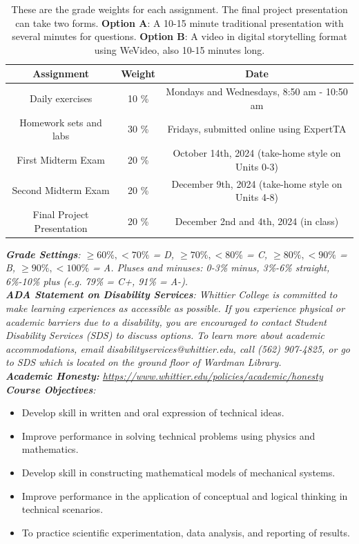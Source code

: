 \documentclass[10pt]{article}
\begin{document}
\begin{table}
\centering
\begin{tabular}{| c | c | c |}
\hline
\textbf{Assignment} & \textbf{Weight} & \textbf{Date} \\ \hline
Daily exercises & 10 \% & Mondays and Wednesdays, 8:50 am - 10:50 am\\ \hline
Homework sets and labs & 30 \% & Fridays, submitted online using ExpertTA \\ \hline
First Midterm Exam & 20 \% & October 14th, 2024 (take-home style on Units 0-3) \\ \hline
Second Midterm Exam & 20 \% & December 9th, 2024 (take-home style on Units 4-8) \\ \hline
Final Project Presentation & 20 \% & December 2nd and 4th, 2024 (in class) \\ \hline
\end{tabular}
\caption{\label{tab:grades} These are the grade weights for each assignment. The final project presentation can take two forms.  \textbf{Option A}: A 10-15 minute traditional presentation with several minutes for questions.  \textbf{Option B}: A video in digital storytelling format using WeVideo, also 10-15 minutes long.}
\end{table}
\noindent
\textit{\textbf{Grade Settings}: $\geq 60\%, <70\%$ = D, $\geq 70\%, <80\%$ = C, $\geq 80\%, <90\%$ = B, $\geq 90\%, <100\%$ = A. Pluses and minuses: 0-3\% minus, 3\%-6\% straight, 6\%-10\% plus (e.g. 79\% = C+, 91\% = A-).} \\
\textit{\textbf{ADA Statement on Disability Services}: Whittier College is committed to make learning experiences as accessible as possible. If you experience physical or academic barriers due to a disability, you are encouraged to contact Student Disability Services (SDS) to discuss options. To learn more about academic accommodations, email disabilityservices@whittier.edu, call (562) 907-4825, or go to SDS which is located on the ground floor of Wardman Library.} \\
\textit{\textbf{Academic Honesty:} \url{https://www.whittier.edu/policies/academic/honesty}} \\
\noindent
\textit{\textbf{Course Objectives}:}
\begin{itemize}
\item Develop skill in written and oral expression of technical ideas.
\item Improve performance in solving technical problems using physics and mathematics.
\item Develop skill in constructing mathematical models of mechanical systems.
\item Improve performance in the application of conceptual and logical thinking in technical scenarios.
\item To practice scientific experimentation, data analysis, and reporting of results.
\end{itemize}
\end{document}
